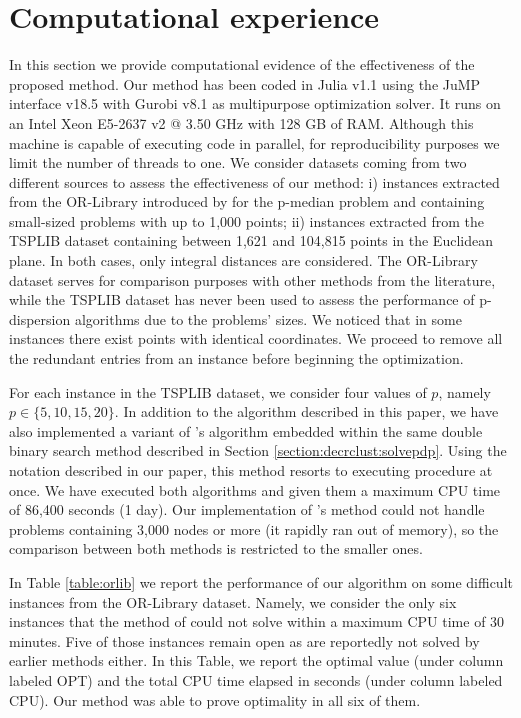 \documentclass[ijoo,nonblindrev]{informs-ijoo}
\begin{document}
\section{Computational experience\label{section:computation}}

In this section we provide computational evidence of the effectiveness of the proposed method. Our method has been coded in Julia v1.1 using the JuMP interface v18.5 with Gurobi v8.1 as multipurpose optimization solver. It runs on an Intel Xeon E5-2637 v2 @ 3.50 GHz with 128 GB of RAM. Although this machine is capable of executing code in parallel, for reproducibility purposes we limit the number of threads to one. We consider datasets coming from two different sources to assess the effectiveness of our method: i) instances extracted from the OR-Library introduced by \citet{orlib} for the p-median problem and containing small-sized problems with up to 1,000 points; ii) instances extracted from the TSPLIB dataset containing between 1,621 and 104,815 points in the Euclidean plane. In both cases, only integral distances are considered. The OR-Library dataset serves for comparison purposes with other methods from the literature, while the TSPLIB dataset has never been used to assess the performance of p-dispersion algorithms due to the problems' sizes. We noticed that in some instances there exist points with identical coordinates. We proceed to remove all the redundant entries from an instance before beginning the optimization.

For each instance in the TSPLIB dataset, we consider four values of $p$, namely $p\in\{5, 10, 15, 20\}$. In addition to the algorithm described in this paper, we have also implemented a variant of \citet{Sayah2017new}'s algorithm embedded within the same double binary search method described in Section \ref{section:decrclust:solvepdp}. Using the notation described in our paper, this method resorts to executing procedure  at once. We have executed both algorithms and given them a maximum CPU time of 86,400 seconds (1 day). Our implementation of \citeauthor{Sayah2017new}'s method could not handle problems containing 3,000 nodes or more (it rapidly ran out of memory), so the comparison between both methods is restricted to the smaller ones.

In Table \ref{table:orlib} we report the performance of our algorithm on some difficult instances from the OR-Library dataset. Namely, we consider the only six instances that the method of \citet{Sayah2017new} could not solve within a maximum CPU time of 30 minutes. Five of those instances remain open as are reportedly not solved by earlier methods either. In this Table, we report the optimal value (under column labeled OPT) and the total CPU time elapsed in seconds (under column labeled CPU). Our method was able to prove optimality in all six of them.
\end{document}
